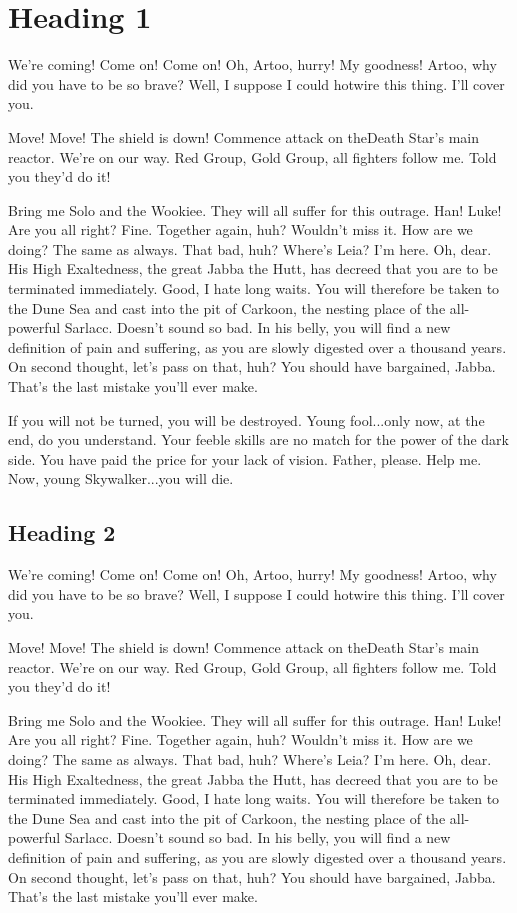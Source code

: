 \section{Heading 1}

We're coming! Come on! Come on! Oh, Artoo, hurry! My goodness! Artoo, why did you have to be so brave? Well, I suppose I could hotwire this thing. I'll cover you.

\citep{Murphy2021}

Move! Move! The shield is down! Commence attack on theDeath Star's main reactor. We're on our way. Red Group, Gold Group, all fighters follow me. Told you they'd do it!

Bring me Solo and the Wookiee. They will all suffer for this outrage. Han! Luke! Are you all right? Fine. Together again, huh? Wouldn't miss it. How are we doing? The same as always. That bad, huh? Where's Leia? I'm here. Oh, dear. His High Exaltedness, the great Jabba the Hutt, has decreed that you are to be terminated immediately. Good, I hate long waits. You will therefore be taken to the Dune Sea and cast into the pit of Carkoon, the nesting place of the all-powerful Sarlacc. Doesn't sound so bad. In his belly, you will find a new definition of pain and suffering, as you are slowly digested over a thousand years. On second thought, let's pass on that, huh? You should have bargained, Jabba. That's the last mistake you'll ever make.

If you will not be turned, you will be destroyed. Young fool...only now, at the end, do you understand. Your feeble skills are no match for the power of the dark side. You have paid the price for your lack of vision. Father, please. Help me. Now, young Skywalker...you will die.

\subsection{Heading 2}

We're coming! Come on! Come on! Oh, Artoo, hurry! My goodness! Artoo, why did you have to be so brave? Well, I suppose I could hotwire this thing. I'll cover you.

Move! Move! The shield is down! Commence attack on theDeath Star's main reactor. We're on our way. Red Group, Gold Group, all fighters follow me. Told you they'd do it!

Bring me Solo and the Wookiee. They will all suffer for this outrage. Han! Luke! Are you all right? Fine. Together again, huh? Wouldn't miss it. How are we doing? The same as always. That bad, huh? Where's Leia? I'm here. Oh, dear. His High Exaltedness, the great Jabba the Hutt, has decreed that you are to be terminated immediately. Good, I hate long waits. You will therefore be taken to the Dune Sea and cast into the pit of Carkoon, the nesting place of the all-powerful Sarlacc. Doesn't sound so bad. In his belly, you will find a new definition of pain and suffering, as you are slowly digested over a thousand years. On second thought, let's pass on that, huh? You should have bargained, Jabba. That's the last mistake you'll ever make.

